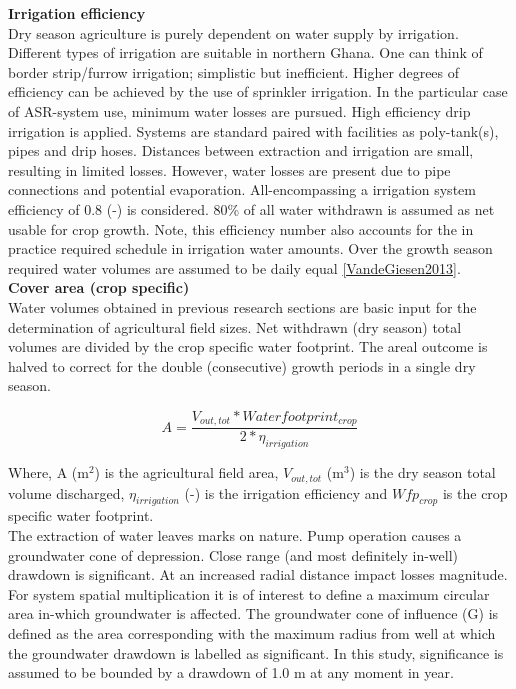 \textbf{Irrigation efficiency} \\
Dry season agriculture is purely dependent on water supply by irrigation. Different types of irrigation are suitable in northern Ghana. One can think of border strip/furrow irrigation; simplistic but inefficient. Higher degrees of efficiency can be achieved by the use of sprinkler irrigation. In the particular case of ASR-system use, minimum water losses are pursued. High efficiency drip irrigation is applied. Systems are standard paired with facilities as poly-tank(s), pipes and drip hoses. Distances between extraction and irrigation are small, resulting in limited losses. However, water losses are present due to pipe connections and potential evaporation. All-encompassing a irrigation system efficiency of 0.8 (-) is considered. 80\% of all water withdrawn is assumed as net usable for crop growth. Note, this efficiency number also accounts for the in practice required schedule in irrigation water amounts. Over the growth season required water volumes are assumed to be daily equal \ref{VandeGiesen2013}. \\

\textbf{Cover area (crop specific)} \\
Water volumes obtained in previous research sections are basic input for the determination of agricultural field sizes. Net withdrawn (dry season) total volumes are divided by the crop specific water footprint. The areal outcome is halved to correct for the double (consecutive) growth periods in a single dry season.   

\begin{equation}
 A = \frac{V_{out,tot} * Water footprint_{crop}}{2 * \eta_{irrigation}} 
\label{eq:A}
\end{equation}

Where, A (m$^2$) is the agricultural field area, $V_{out,tot}$ (m$^3$) is the dry season total volume discharged, $\eta_{irrigation}$ (-) is the irrigation efficiency and $Wfp_{crop}$ is the crop specific water footprint. \\

The extraction of water leaves marks on nature. Pump operation causes a groundwater cone of depression. Close range (and most definitely in-well) drawdown is significant. At an increased radial distance impact losses magnitude. For system spatial multiplication it is of interest to define a maximum circular area in-which groundwater is affected. The groundwater cone of influence (G) is defined as the area corresponding with the maximum radius from well at which the groundwater drawdown is labelled as significant. In this study, significance is assumed to be bounded by a drawdown of 1.0 m at any moment in year. \\

